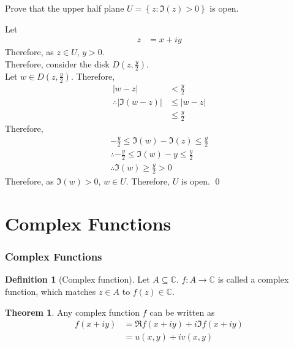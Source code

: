 \documentclass[titlepage, fleqn, a4paper, 12pt, twoside]{article}
\theoremstyle{definition}
\newtheorem{definition}{Definition}
\theoremstyle{theorem}
\newtheorem{theorem}{Theorem}
\begin{document}
\begin{question}
	Prove that the upper half plane $U = \left\{ z : \Im(z) > 0 \right\}$ is open.
\end{question}

\begin{solution}
	Let
	\begin{align*}
		z & = x + i y
	\end{align*}
	Therefore, as $z \in U$, $y > 0$.\\
	Therefore, consider the disk $D\left( z , \frac{y}{2} \right)$.\\
	Let $w \in D\left( z , \frac{y}{2} \right)$.
	Therefore,
	\begin{align*}
		|w - z|                              & < \frac{y}{2} \\
		\therefore \left| \Im(w - z) \right| & \le |w - z|   \\
                                                     & \le \frac{y}{2}
	\end{align*}
	Therefore,
	\begin{gather*}
		-\frac{y}{2} \le \Im(w) - \Im(z) \le \frac{y}{2}\\
		\therefore -\frac{y}{2} \le \Im(w) - y \le \frac{y}{2}\\
		\therefore \Im(w) \ge \frac{y}{2} > 0
	\end{gather*}
	Therefore, as $\Im(w) > 0$, $w \in U$.
	Therefore, $U$ is open.
	\qed
\end{solution}

\newpage
\part{Complex Functions}

\section{Complex Functions}

\begin{definition}[Complex function]
	Let $A \subseteq \mathbb{C}$.
	$f : A \to \mathbb{C}$ is called a complex function, which matches $z \in A$ to $f(z) \in \mathbb{C}$.
\end{definition}

\begin{theorem}
	Any complex function $f$ can be written as
	\begin{align*}
		f(x + i y) & = \Re f(x + i y) + i \Im f(x + i y) \\
                           & = u(x,y) + i v(x,y)
	\end{align*}
\end{theorem}
\end{document}
